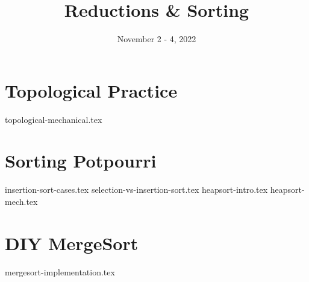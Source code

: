 \documentclass[11pt]{exam}
\title{Reductions \& Sorting}
\date{November 2 - 4, 2022}
\begin{document}
\maketitle

\section{Topological Practice}
\begin{questions}
{topological-mechanical.tex}
\end{questions}


\pagebreak
\section{Sorting Potpourri}
\begin{questions}
{insertion-sort-cases.tex}
\vspace{15mm}
{selection-vs-insertion-sort.tex}
\vspace{15mm}
{heapsort-intro.tex}
\vspace{20mm}
{heapsort-mech.tex}
\end{questions}
\clearpage

\pagebreak
\section{DIY MergeSort}
\begin{questions}
{mergesort-implementation.tex}
\end{questions}
\end{document}
